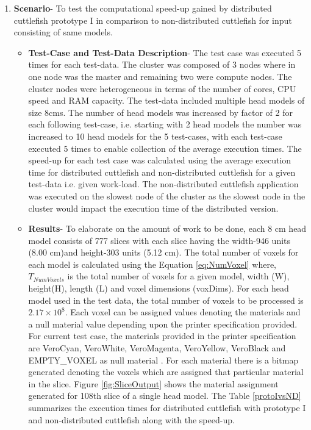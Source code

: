 \begin{enumerate}
\item{\textbf{Scenario}}- To test the computational speed-up gained by distributed cuttlefish prototype I in comparison to non-distributed cuttlefish for input consisting of same models.
\begin{itemize}
\item{\textbf{Test-Case and Test-Data Description}}- The test case was executed 5 times for each test-data. The cluster was composed of 3 nodes where in one node was the master and remaining two were compute nodes. The cluster nodes were heterogeneous in terms of the number of cores, CPU speed and RAM capacity. The test-data included multiple head models of size 8cms. The number of head models was increased by factor of 2 for each following test-case, i.e. starting with 2 head models the number was increased to 10 head models for the 5 test-cases, with each test-case executed 5 times to enable collection of the average execution times. The speed-up for each test case was calculated using the average execution time for distributed cuttlefish and non-distributed cuttlefish for a given test-data i.e. given work-load. The non-distributed cuttlefish application was executed on the slowest node of the cluster as the slowest node in the cluster would impact the execution time of the distributed version. 
\item{\textbf{Results}}- To elaborate on the amount of work to be done, each 8 cm head model consists of 777 slices with each slice having the width-946 units (8.00 cm)and height-303 units (5.12 cm). The total number of voxels for each model is calculated using the Equation \ref{eq:NumVoxel} where, \begin{math} T_{NumVoxels} \end{math} is the total number of voxels for a given model, width (W), height(H), length (L) and voxel dimensions (voxDims). For each head model used in the test data, the total number of voxels to be processed is \begin{math} 2.17 \times 10^{8} \end{math}. Each voxel can be assigned values denoting the materials and a null material value depending upon the printer specification provided. For current test case, the materials provided in the printer specification are VeroCyan, VeroWhite, VeroMagenta, VeroYellow, VeroBlack and EMPTY\_VOXEL as null material . For each material there is a bitmap generated denoting the voxels which are assigned that particular material in the slice. Figure \ref{fig:SliceOutput} shows the material assignment generated for 108th slice of a single head model. The Table \ref{protoIvsND} summarizes the execution times for distributed cuttlefish with prototype I and non-distributed cuttlefish along with the speed-up.  

\end{itemize}
\end{enumerate}
